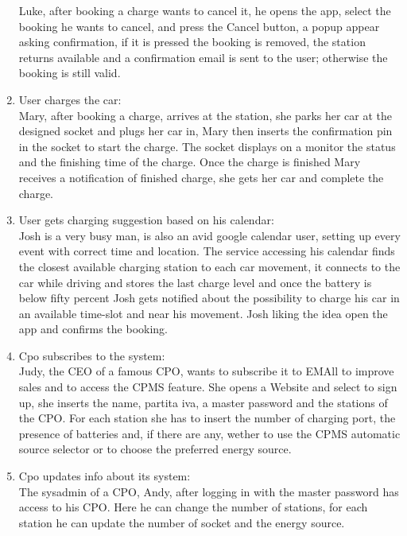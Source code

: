 \begin{enumerate}[label=S\arabic*]
            Luke, after booking a charge wants to cancel it, he opens the app, select the booking he wants to cancel,
            and press the Cancel button, a popup appear asking confirmation, if it is pressed the booking is removed,
            the station returns available and a confirmation email is sent to the user; otherwise the booking is still valid.
      \item User charges the car:\\
            Mary, after booking a charge, arrives at the station, she parks her car at the designed socket
            and plugs her car in, Mary then inserts the confirmation pin in the socket to start the charge.
            The socket displays on a monitor the status and the finishing time of the charge.
            Once the charge is finished Mary receives a notification of finished charge,
            she gets her car and complete the charge.
      \item User gets charging suggestion based on his calendar:\\
            Josh is a very busy man, is also an avid google calendar user,
            setting up every event with correct time and location.
            The service accessing his calendar finds the closest available charging station to each car movement,
            it connects to the car while driving and stores the last charge level and once the battery is below fifty percent Josh gets notified
            about the possibility to charge his car in an available time-slot and near his movement.
            Josh liking the idea open the app and confirms the booking.
      \item Cpo subscribes to the system:\\
            Judy, the CEO of a famous CPO, wants to subscribe it to EMAll to improve sales and to access the CPMS feature.
            She opens a Website and select to sign up, she inserts the name, partita iva, a master password and the stations of the CPO.
            For each station she has to insert the number of charging port, the presence of batteries and, if there are any,
            wether to use the CPMS automatic source selector or to choose the preferred energy source.
      \item Cpo updates info about its system:\\
            The sysadmin of a CPO, Andy, after logging in with the master password has access to his CPO.
            Here he can change the number of stations, for each station he can update the number of socket and the energy source.

\end{enumerate}
